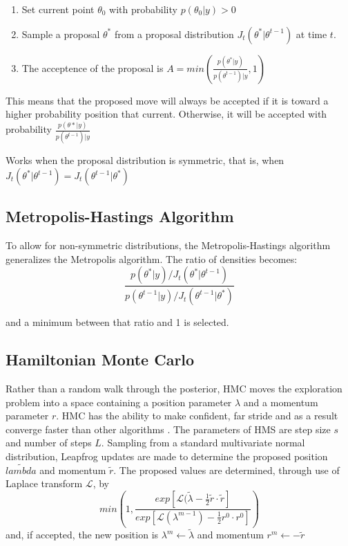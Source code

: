 \begin{enumerate}
\tightlist
\item{Set current point $\theta_0$ with probability $p(\theta_0|y) > 0$}

\item{Sample a proposal $\theta^*$ from a proposal distribution $J_t(\theta^* | \theta^{t-1})$ at time $t$.}

\item{The acceptence of the proposal is $A = min \left( \frac{p(\theta^*|y)}{p(\theta^{t-1})|y} , 1 \right) $}
\end{enumerate}

This means that the proposed move will always be accepted if it is toward a higher probability position that current.  Otherwise, it will be accepted with probability $\frac{p(\theta*|y)}{p(\theta^{t-1})|y}$

Works when the proposal distribution is symmetric, that is, when $J_t(\theta^* | \theta^{t-1}) = J_t(\theta^{t-1} | \theta^*)$

\subsection{Metropolis-Hastings Algorithm}

To allow for non-symmetric distributions, the Metropolis-Hastings algorithm generalizes the Metropolis algorithm.  The ratio of densities becomes:
$$
\frac{ p(\theta^*|y) / J_t(\theta^* | \theta^{t-1}) }{ p(\theta^{t-1}|y) / J_t(\theta^{t-1} | \theta^*) }
$$

and a minimum between that ratio and 1 is selected.

\subsection{Hamiltonian Monte Carlo}

Rather than a random walk through the posterior, HMC moves the exploration problem into a space containing a position parameter $\lambda$ and a momentum parameter $r$.  HMC has the ability to make confident, far stride and as a result converge faster than other algorithms \cite{mullachery2018bayesian}.
The parameters of HMS are step size $s$ and number of steps $L$. Sampling from a standard multivariate normal distribution, Leapfrog updates are made to determine the proposed position $\tilde{lambda}$ and momentum $\tilde{r}$.  The proposed values are determined, through use of Laplace transform $\mathcal{L}$, by
$$
min\left( 1, \frac{exp[\mathcal{L}(\tilde{\lambda} - \frac{1}{2} \tilde{r} \cdot \tilde{r}]}
{exp[\mathcal{L}(\lambda^{m-1}) - \frac{1}{2} r^0 \cdot r^0] }
\right)
$$
and, if accepted, the new position is $\lambda^m \leftarrow \tilde{\lambda}$ and momentum $r^m \leftarrow -\tilde{r}$

